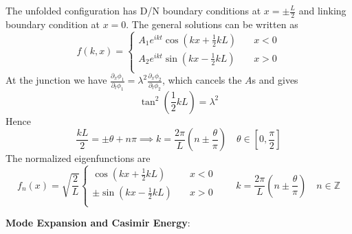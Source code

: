 \documentclass{article}
\begin{document}
The unfolded configuration has D/N boundary conditions at $x = \pm \frac{L}{2}$ and linking boundary condition at $x = 0$. The general solutions can be written as
\begin{equation}
f(k, x) = 
\left\lbrace
\begin{aligned}
  A_1 e^{i kt} \cos(kx +\frac{1}{2}kL ) &  \quad x < 0  \\
  A_2 e^{ikt}  \sin(kx - \frac{1}{2}kL ) & \quad x > 0   \\
\end{aligned} \right. 
\end{equation}
At the junction we have $\frac{\partial_x \phi_1}{ \partial_t \phi_1} = \lambda^2 \frac{\partial_x \phi_2}{ \partial_t \phi_2}$, which cancels the $A$s and gives
\begin{equation}
\tan ^2 (\frac{1}{2} kL ) = \lambda^2 
\end{equation}
Hence
\begin{equation}
 \frac{kL}{2} = \pm \theta + n \pi \implies  k = \frac{2\pi}{L}( n \pm \frac{\theta}{\pi} )  \quad \theta \in [0,\frac{\pi}{2} ]  
\end{equation}
The normalized eigenfunctions are
\begin{equation}
f_n(x) = \sqrt{\frac{2}{L}}
\left\lbrace
\begin{aligned}
  \cos(kx +\frac{1}{2}kL ) &  \quad x < 0  \\
  \pm \sin(kx - \frac{1}{2}kL ) & \quad x > 0   \\
\end{aligned} \right. 
\qquad 
k = \frac{2\pi}{L}( n \pm  \frac{\theta}{\pi} )  \quad n \in \mathbb{Z} 
\end{equation}

{\bf Mode Expansion and Casimir Energy}:
\end{document}
